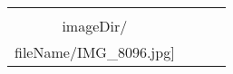 \begin{table}
\begin{tabular}{cccc}
\texttt{[image: \\imageDir/\\fileName/IMG\_8096.jpg]} 
\end{tabular}
\end{table}

